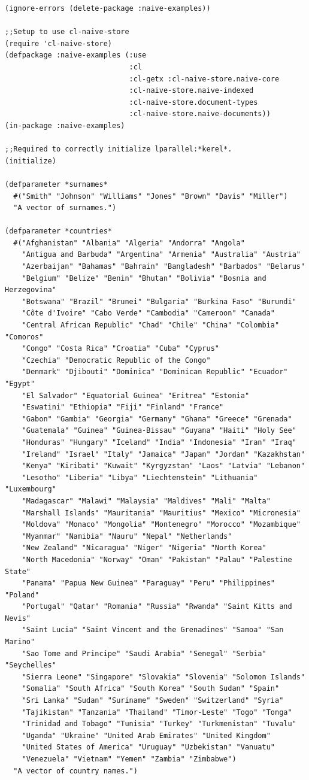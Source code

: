 \documentclass[11pt]{article}
\begin{document}
\begin{verbatim}
(ignore-errors (delete-package :naive-examples))

;;Setup to use cl-naive-store
(require 'cl-naive-store)
(defpackage :naive-examples (:use
                             :cl
                             :cl-getx :cl-naive-store.naive-core
                             :cl-naive-store.naive-indexed
                             :cl-naive-store.document-types
                             :cl-naive-store.naive-documents))
(in-package :naive-examples)

;;Required to correctly initialize lparallel:*kerel*.
(initialize)

(defparameter *surnames*
  #("Smith" "Johnson" "Williams" "Jones" "Brown" "Davis" "Miller")
  "A vector of surnames.")

(defparameter *countries*
  #("Afghanistan" "Albania" "Algeria" "Andorra" "Angola"
    "Antigua and Barbuda" "Argentina" "Armenia" "Australia" "Austria"
    "Azerbaijan" "Bahamas" "Bahrain" "Bangladesh" "Barbados" "Belarus"
    "Belgium" "Belize" "Benin" "Bhutan" "Bolivia" "Bosnia and Herzegovina"
    "Botswana" "Brazil" "Brunei" "Bulgaria" "Burkina Faso" "Burundi"
    "Côte d'Ivoire" "Cabo Verde" "Cambodia" "Cameroon" "Canada"
    "Central African Republic" "Chad" "Chile" "China" "Colombia" "Comoros"
    "Congo" "Costa Rica" "Croatia" "Cuba" "Cyprus"
    "Czechia" "Democratic Republic of the Congo"
    "Denmark" "Djibouti" "Dominica" "Dominican Republic" "Ecuador" "Egypt"
    "El Salvador" "Equatorial Guinea" "Eritrea" "Estonia"
    "Eswatini" "Ethiopia" "Fiji" "Finland" "France"
    "Gabon" "Gambia" "Georgia" "Germany" "Ghana" "Greece" "Grenada"
    "Guatemala" "Guinea" "Guinea-Bissau" "Guyana" "Haiti" "Holy See"
    "Honduras" "Hungary" "Iceland" "India" "Indonesia" "Iran" "Iraq"
    "Ireland" "Israel" "Italy" "Jamaica" "Japan" "Jordan" "Kazakhstan"
    "Kenya" "Kiribati" "Kuwait" "Kyrgyzstan" "Laos" "Latvia" "Lebanon"
    "Lesotho" "Liberia" "Libya" "Liechtenstein" "Lithuania" "Luxembourg"
    "Madagascar" "Malawi" "Malaysia" "Maldives" "Mali" "Malta"
    "Marshall Islands" "Mauritania" "Mauritius" "Mexico" "Micronesia"
    "Moldova" "Monaco" "Mongolia" "Montenegro" "Morocco" "Mozambique"
    "Myanmar" "Namibia" "Nauru" "Nepal" "Netherlands"
    "New Zealand" "Nicaragua" "Niger" "Nigeria" "North Korea"
    "North Macedonia" "Norway" "Oman" "Pakistan" "Palau" "Palestine State"
    "Panama" "Papua New Guinea" "Paraguay" "Peru" "Philippines" "Poland"
    "Portugal" "Qatar" "Romania" "Russia" "Rwanda" "Saint Kitts and Nevis"
    "Saint Lucia" "Saint Vincent and the Grenadines" "Samoa" "San Marino"
    "Sao Tome and Principe" "Saudi Arabia" "Senegal" "Serbia" "Seychelles"
    "Sierra Leone" "Singapore" "Slovakia" "Slovenia" "Solomon Islands"
    "Somalia" "South Africa" "South Korea" "South Sudan" "Spain"
    "Sri Lanka" "Sudan" "Suriname" "Sweden" "Switzerland" "Syria"
    "Tajikistan" "Tanzania" "Thailand" "Timor-Leste" "Togo" "Tonga"
    "Trinidad and Tobago" "Tunisia" "Turkey" "Turkmenistan" "Tuvalu"
    "Uganda" "Ukraine" "United Arab Emirates" "United Kingdom"
    "United States of America" "Uruguay" "Uzbekistan" "Vanuatu"
    "Venezuela" "Vietnam" "Yemen" "Zambia" "Zimbabwe")
  "A vector of country names.")


\end{verbatim}
\end{document}
